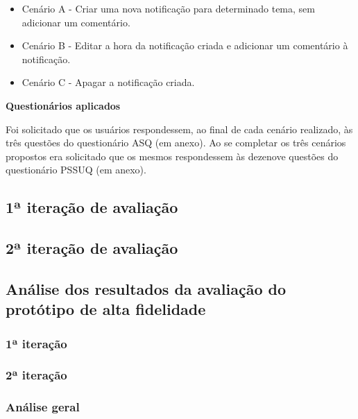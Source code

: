       \begin{itemize}
	  \item Cenário A - Criar uma nova notificação para determinado tema, sem adicionar um comentário.
	  \item Cenário B - Editar a hora da notificação criada e adicionar um comentário à notificação.
	  \item Cenário C - Apagar a notificação criada.
      \end{itemize}
      
      \noindent
      \textbf{Questionários aplicados}
      
	Foi solicitado que os usuários respondessem, ao final de cada cenário realizado, às três questões do
	questionário ASQ (em anexo). Ao se completar os três cenários propostos era solicitado que os mesmos 
	respondessem às dezenove questões do questionário PSSUQ (em anexo).
    
    \subsection{1ª iteração de avaliação}
      
	
  
      \pagebreak
      
    \subsection{2ª iteração de avaliação}
	
	
  
    \pagebreak
    \subsection{Análise dos resultados da avaliação do protótipo de alta fidelidade}
     
      
      \subsubsection{1ª iteração}
      
      
      \subsubsection{2ª iteração}
      
      
      \subsubsection{Análise geral}
      
      
    
